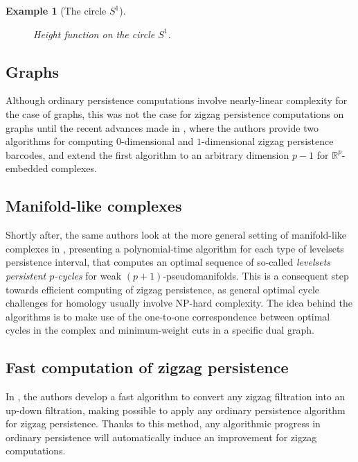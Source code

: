 \documentclass[11pt]{article}
\newtheorem{example}[theorem]{Example}
\theoremstyle{remark}
\newcommand{\R}{\mathbb{R}}
\begin{document}
\begin{example}[The circle $S^1$]
\begin{figure}
\begin{tikzpicture}[x=0.75pt,y=0.75pt,yscale=-1,xscale=1]
\end{tikzpicture}
\caption{Height function on the circle $S^1$.}
\end{figure}


\end{example}







\subsection{Graphs}

Although ordinary persistence computations involve nearly-linear complexity for the case of graphs, this was not the case for zigzag persistence computations on graphs until the recent advances made in \cite{dey2021computing_}, where the authors provide two algorithms for computing $0$-dimensional and $1$-dimensional zigzag persistence barcodes, and extend the first algorithm to an arbitrary dimension $p-1$ for $\R^p$-embedded complexes.

\subsection{Manifold-like complexes}

Shortly after, the same authors look at the more general setting of manifold-like complexes in \cite{dey2021computing}, presenting a polynomial-time
algorithm for each type of levelsets persistence interval, that computes an optimal sequence of so-called \textit{levelsets persistent $p$-cycles} for weak $(p+1)$-pseudomanifolds. This is a consequent step towards efficient computing of zigzag persistence, as general optimal cycle challenges for homology usually involve NP-hard complexity. The idea behind the algorithms is to make use of the one-to-one correspondence between optimal cycles in the complex and minimum-weight cuts in a specific dual graph.


\subsection{Fast computation of zigzag persistence}

In \cite{Dey22}, the authors develop a fast algorithm to convert any zigzag filtration into an up-down filtration, making possible to apply any ordinary persistence algorithm for zigzag persistence. Thanks to this method, any algorithmic progress in ordinary persistence will automatically induce an improvement for zigzag computations.
\end{document}
